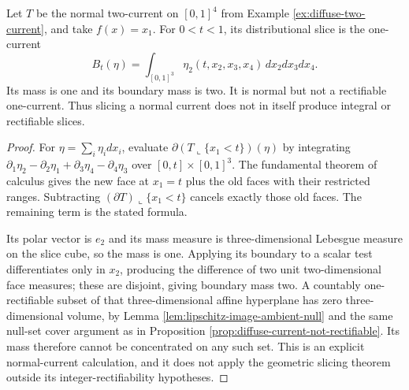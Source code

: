 \begin{example}\label{ex:diffuse-current-slices}
Let $T$ be the normal two-current on $[0,1]^4$ from Example \ref{ex:diffuse-two-current}, and take $f(x)=x_1$. For $0<t<1$, its distributional slice is the one-current
\[
 B_t(\eta)=\int_{[0,1]^3}\eta_2(t,x_2,x_3,x_4)\,dx_2dx_3dx_4.
\]
Its mass is one and its boundary mass is two. It is normal but not a rectifiable one-current. Thus slicing a normal current does not in itself produce integral or rectifiable slices.
\end{example}
\begin{proof}
For $\eta=\sum_i\eta_i dx_i$, evaluate $\partial(T\llcorner\{x_1<t\})(\eta)$ by integrating
$\partial_1\eta_2-\partial_2\eta_1+\partial_3\eta_4-\partial_4\eta_3$
over $[0,t]\times[0,1]^3$. The fundamental theorem of calculus gives the new face at $x_1=t$ plus the old faces with their restricted ranges. Subtracting $(\partial T)\llcorner\{x_1<t\}$ cancels exactly those old faces. The remaining term is the stated formula.

Its polar vector is $e_2$ and its mass measure is three-dimensional Lebesgue measure on the slice cube, so the mass is one. Applying its boundary to a scalar test differentiates only in $x_2$, producing the difference of two unit two-dimensional face measures; these are disjoint, giving boundary mass two. A countably one-rectifiable subset of that three-dimensional affine hyperplane has zero three-dimensional volume, by Lemma \ref{lem:lipschitz-image-ambient-null} and the same null-set cover argument as in Proposition \ref{prop:diffuse-current-not-rectifiable}. Its mass therefore cannot be concentrated on any such set. This is an explicit normal-current calculation, and it does not apply the geometric slicing theorem outside its integer-rectifiability hypotheses.
\end{proof}
